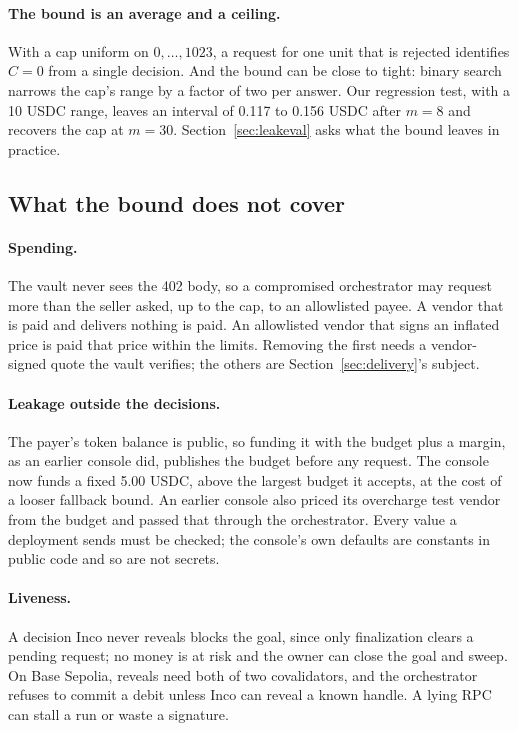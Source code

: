 \paragraph{The bound is an average and a ceiling.} With a cap uniform on $0, \ldots, 1023$, a request for one unit that is rejected identifies
$C = 0$ from a single decision. And the bound can be close to tight: binary search narrows the cap's range by a factor of two per answer. Our
regression test, with a 10 USDC range, leaves an interval of 0.117 to 0.156 USDC after $m = 8$ and recovers the cap at $m = 30$.
Section~\ref{sec:leakeval} asks what the bound leaves in practice.

\subsection{What the bound does not cover}
\label{sec:otherleak}

\paragraph{Spending.} The vault never sees the 402 body, so a compromised orchestrator may request more than the seller asked, up to the cap, to an
allowlisted payee. A vendor that is paid and delivers nothing is paid. An allowlisted vendor that signs an inflated price is paid that price within
the limits. Removing the first needs a vendor-signed quote the vault verifies; the others are Section~\ref{sec:delivery}'s subject.

\paragraph{Leakage outside the decisions.} The payer's token balance is public, so funding it with the budget plus a margin, as an earlier console
did, publishes the budget before any request. The console now funds a fixed 5.00 USDC, above the largest budget it accepts, at the cost of a looser
fallback bound. An earlier console also priced its overcharge test vendor from the budget and passed that through the orchestrator. Every value a
deployment sends must be checked; the console's own defaults are constants in public code and so are not secrets.

\paragraph{Liveness.} A decision Inco never reveals blocks the goal, since only finalization clears a pending request; no money is at risk and the
owner can close the goal and sweep. On Base Sepolia, reveals need both of two covalidators, and the orchestrator refuses to commit a debit unless Inco
can reveal a known handle. A lying RPC can stall a run or waste a signature.
